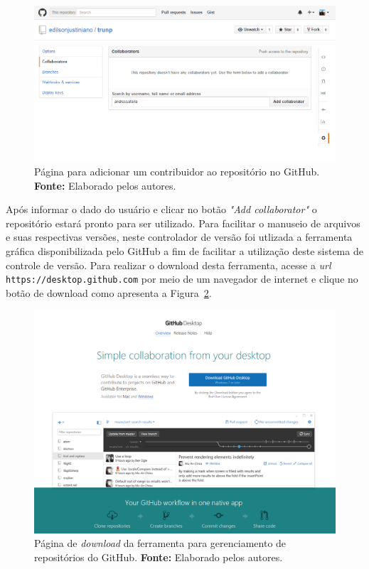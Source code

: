 \captionsetup[figure]{list=no}
\begin{figure}[h!]
	\centerline{\includegraphics[scale=0.5]{./imagens/apendices/pagina-adicionar-colaborador-ao-repositorio.png}}
	\caption[Página para adicionar um contribuidor ao repositório no GitHub.]
	{Página para adicionar um contribuidor ao repositório no GitHub. \textbf{Fonte:} Elaborado pelos autores.}
	\label{fig:ap3:pagina_adicionar_colaborador_repositorio_github}
\end{figure}

Após informar o dado do usuário e clicar no botão \textit{"Add collaborator"} o repositório estará pronto para ser utilizado. Para facilitar o manuseio de arquivos e suas respectivas versões, neste controlador de versão foi utlizada a ferramenta gráfica disponibilizada pelo GitHub a fim de facilitar a utilização deste sistema de controle de versão. Para realizar o download desta ferramenta, acesse a \textit{url} \texttt{https://desktop.github.com} por meio de um navegador de internet e clique no botão de download como apresenta a Figura~\ref{fig:ap3:pagina_download_github_para_windows}.

\captionsetup[figure]{list=no}
\begin{figure}[h!]
	\centerline{\includegraphics[scale=0.4]{./imagens/apendices/pagina-download-github.png}}
	\caption[Página de \textit{download} da ferramenta para gerenciamento de repositórios do GitHub.]
	{Página de \textit{download} da ferramenta para gerenciamento de repositórios do GitHub. \textbf{Fonte:} Elaborado pelos autores.}
	\label{fig:ap3:pagina_download_github_para_windows}
\end{figure}

